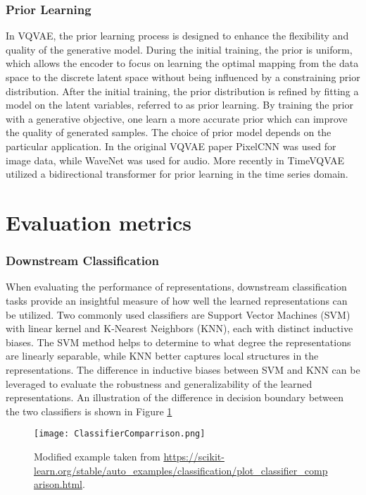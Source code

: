 \documentclass[../../thesis.tex]{subfiles}
\begin{document}
\subsubsection{Prior Learning}
In VQVAE, the prior learning process is designed to enhance the flexibility and quality of the generative model. During the initial training, the prior is uniform, which allows the encoder to focus on learning the optimal mapping from the data space to the discrete latent space without being influenced by a constraining prior distribution. After the initial training, the prior distribution is refined by fitting a model on the latent variables, referred to as prior learning. By training the prior with a generative objective, one learn a more accurate prior which can improve the quality of generated samples. The choice of prior model depends on the particular application. In the original VQVAE paper PixelCNN \cite{oord2016pixel} was used for image data, while WaveNet \cite{oord2016wavenet} was used for audio. More recently in TimeVQVAE \cite{TimeVQVAE} utilized a bidirectional transformer \cite{chang2022maskgit} for prior learning in the time series domain. 

\section{Evaluation metrics}

\subsubsection{Downstream Classification}

When evaluating the performance of representations, downstream classification tasks provide an insightful measure of how well the learned representations can be utilized. Two commonly used classifiers are Support Vector Machines (SVM) with linear kernel and K-Nearest Neighbors (KNN), each with distinct inductive biases. The SVM method helps to determine to what degree the representations are linearly separable, while KNN better captures local structures in the representations. The difference in inductive biases between SVM and KNN can be leveraged to evaluate the robustness and generalizability of the learned representations. An illustration of the difference in decision boundary between the two classifiers is shown in Figure \ref{fig:ClassifierComparrison}

\begin{figure}[h]
    \texttt{[image: ClassifierComparrison.png]}
    \centering
    \caption{Modified example taken from \url{https://scikit-learn.org/stable/auto_examples/classification/plot_classifier_comparison.html}.}
    \label{fig:ClassifierComparrison}
\end{figure}
\end{document}
